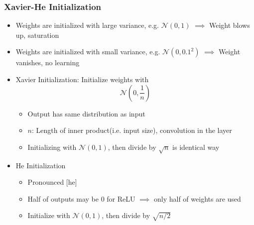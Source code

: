 \subsubsection*{Xavier-He Initialization}
\begin{itemize}
    \item Weights are initialized with large variance, e.g. $\mathcal{N}(0,1)$ $\implies$ Weight blows up, saturation
    \item Weights are initialized with small variance, e.g. $\mathcal{N}(0,0.1^2)$ $\implies$ Weight vanishes, no learning
    \item Xavier Initialization: Initialize weights with
    \begin{equation}
        \mathcal{N}\left(0,\frac{1}{n}\right)
    \end{equation}
    \begin{itemize}
        \item Output has same distribution as input
        \item $n$: Length of inner product(i.e. input size), convolution in the layer
        \item Initializing with $\mathcal{N}(0,1)$, then divide by $\sqrt{n}$ is identical way
    \end{itemize}
    \item He Initialization
    \begin{itemize}
        \item Pronounced [he]
        \item Half of outputs may be 0 for ReLU $\implies$ only half of weights are used
        \item Initialize with $\mathcal{N}(0,1)$, then divide by $\sqrt{n/2}$
    \end{itemize}
\end{itemize}
\clearpage
\begin{figures}
\end{figures}
